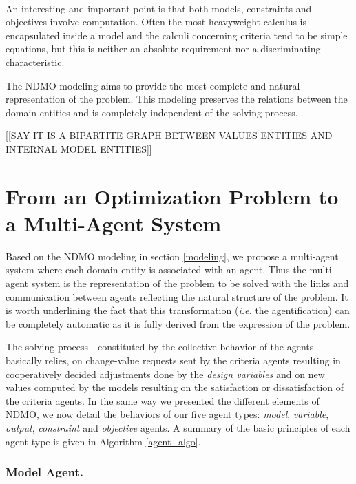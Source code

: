 \paragraph*{}
An interesting and important point is that both models, constraints and objectives involve computation. Often the most heavyweight calculus is encapsulated inside a model and the calculi concerning criteria tend to be simple equations, but this is neither an absolute requirement nor a discriminating characteristic.

The NDMO modeling aims to provide the most complete and natural representation of the problem. This modeling preserves the relations between the domain entities and is completely independent of the solving process. 

[[SAY IT IS A BIPARTITE GRAPH BETWEEN VALUES ENTITIES AND INTERNAL MODEL ENTITIES]]

\section{From an Optimization Problem to a Multi-Agent System}

Based on the NDMO modeling in section \ref{modeling}, we propose a multi-agent system where each domain entity is associated with an agent. Thus the multi-agent system is the representation of the problem to be solved with the links and communication between agents reflecting the natural structure of the problem. It is worth underlining the fact that this transformation (\textit{i.e.} the agentification) can be completely automatic as it is fully derived from the expression of the problem.

The solving process - constituted by the collective behavior of the agents - basically relies, on change-value requests sent by the criteria agents resulting in cooperatively decided adjustments done by the \emph{design variables} and on new values computed by the models resulting on the satisfaction or dissatisfaction of the criteria agents. 
In the same way we presented the different elements of NDMO, we now detail the behaviors of our five agent types: \emph{model}, \emph{variable}, \emph{output}, \emph{constraint} and \emph{objective} agents.
A summary of the basic principles of each agent type is given in Algorithm \ref{agent_algo}.

\subsubsection*{Model Agent.}

